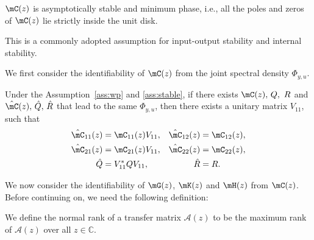   \begin{myass}\label{ass:stable}
    $\mC(z)$ is asymptotically stable and minimum phase, i.e., all the poles and zeros of $\mC(z)$ lie strictly inside the unit disk.
  \end{myass}

  \begin{remark}
    This is a commonly adopted assumption for input-output stability and internal stability.
  \end{remark}

  We first consider the identifiability of $\mC(z)$ from the joint spectral density $\Phi_{y,u}$. 

  \begin{lemma}\label{lemma:idgk}
    Under the Assumption~\ref{ass:wp} and \ref{ass:stable}, if there exists $\mC(z),\,Q,\,\,R$ and $\hat \mC(z),\,\hat Q,\,\hat R$ that lead to the same $\Phi_{y,u}$, then there exists a unitary matrix $V_{11}$, such that
    \begin{align}
      \hat \mC_{11}(z) &= \mC_{11}(z)V_{11},
      &\hat \mC_{12}(z)&= \mC_{12}(z),\nonumber\\ 
      \hat \mC_{21}(z) &= \mC_{21}(z)V_{11},
      &\hat \mC_{22}(z)&= \mC_{22}(z)\nonumber,\\ 
      \hat Q &=V^*_{11}QV_{11},
      &\hat R &= R.\label{eq:Cidentifability}
    \end{align}
  \end{lemma}

  We now consider the identifiability of $\mG(z)$, $\mK(z)$ and $\mH(z)$ from $\mC(z)$. Before continuing on, we need the following definition:
  \begin{mydef}
    We define the normal rank of a transfer matrix $\mathcal A(z)$ to be the maximum rank of $\mathcal A(z)$ over all $z\in \mathbb{C}$. 
  \end{mydef}

